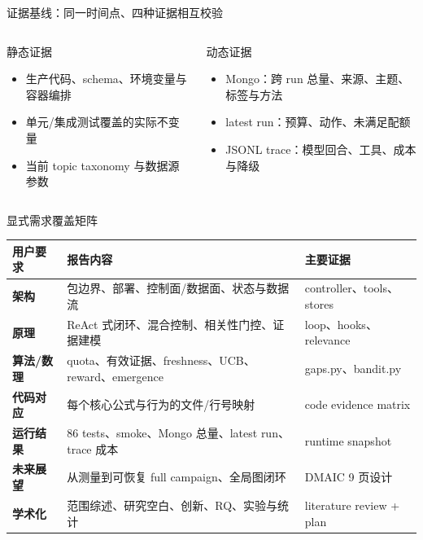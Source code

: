 \begin{frame}{证据基线：同一时间点、四种证据相互校验}
\centering
{}\hfill
{}\hfill
{}\hfill
{}

\vspace{1.2em}
\begin{columns}[T,onlytextwidth]
\begin{block}{静态证据}
\begin{itemize}
  \item 生产代码、schema、环境变量与容器编排
  \item 单元/集成测试覆盖的实际不变量
  \item 当前 topic taxonomy 与数据源参数
\end{itemize}
\end{block}
\begin{block}{动态证据}
\begin{itemize}
  \item Mongo：跨 run 总量、来源、主题、标签与方法
  \item latest run：预算、动作、未满足配额
  \item JSONL trace：模型回合、工具、成本与降级
\end{itemize}
\end{block}
\end{columns}

\end{frame}

\begin{frame}{显式需求覆盖矩阵}
\small
\begin{tabularx}{\textwidth}{>{\bfseries}p{} X p{}}
\toprule
用户要求 & 报告内容 & 主要证据 \\
\midrule
架构 & 包边界、部署、控制面/数据面、状态与数据流 & controller、tools、stores \\
原理 & ReAct 式闭环、混合控制、相关性门控、证据建模 & loop、hooks、relevance \\
算法/数理 & quota、有效证据、freshness、UCB、reward、emergence & gaps.py、bandit.py \\
代码对应 & 每个核心公式与行为的文件/行号映射 & code evidence matrix \\
运行结果 & 86 tests、smoke、Mongo 总量、latest run、trace 成本 & runtime snapshot \\
未来展望 & 从测量到可恢复 full campaign、全局图闭环 & DMAIC 9 页设计 \\
学术化 & 范围综述、研究空白、创新、RQ、实验与统计 & literature review + plan \\
\bottomrule
\end{tabularx}
\end{frame}

